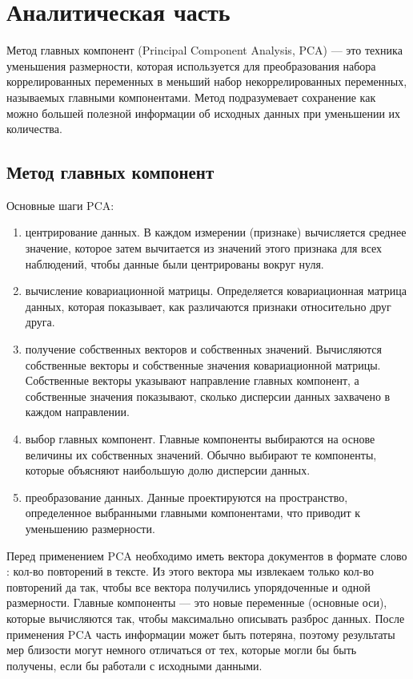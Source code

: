 \chapter{Аналитическая часть}

Метод главных компонент (Principal Component Analysis, PCA) — это техника уменьшения размерности,
которая используется для преобразования набора коррелированных переменных в меньший набор некоррелированных переменных,
называемых главными компонентами. Метод подразумевает сохранение как можно большей полезной информации об исходных данных при уменьшении их количества.

\section{Метод главных компонент}\label{PCA}

Основные шаги PCA:
\begin{enumerate}
    \item центрирование данных. В каждом измерении (признаке) вычисляется среднее значение, 
    которое затем вычитается из значений этого признака для всех наблюдений, чтобы данные были центрированы вокруг нуля.
    \item вычисление ковариационной матрицы. Определяется ковариационная матрица данных, которая показывает, как различаются признаки относительно друг друга.
    \item получение собственных векторов и собственных значений. Вычисляются собственные векторы и собственные значения ковариационной матрицы. 
    Собственные векторы указывают направление главных компонент, а собственные значения показывают, сколько дисперсии данных захвачено в каждом направлении.
    \item выбор главных компонент. Главные компоненты выбираются на основе величины их собственных значений. 
    Обычно выбирают те компоненты, которые объясняют наибольшую долю дисперсии данных.
    \item преобразование данных. Данные проектируются на пространство, определенное выбранными главными компонентами, что приводит к уменьшению размерности.
\end{enumerate}

Перед применением PCA необходимо иметь вектора документов в формате {слово : кол-во повторений в тексте}. Из этого вектора мы извлекаем только кол-во повторений да так,
чтобы все вектора получились упорядоченные и одной размерности. 
Главные компоненты — это новые переменные (основные оси), которые вычисляются так, чтобы максимально описывать разброс данных.
После применения PCA часть информации может быть потеряна, поэтому результаты мер близости могут немного отличаться от тех, которые могли бы быть получены,
если бы работали с исходными данными.

